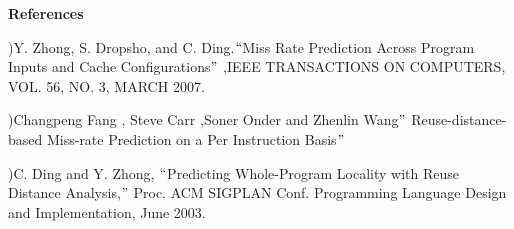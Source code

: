 \documentclass[12pt]{article}
\begin{document}
\vspace{\baselineskip}
{\fontsize{20pt}{24.0pt}\selectfont \textbf{References}\par}\par


\vspace{\baselineskip}

\vspace{\baselineskip}
\begin{adjustwidth}{0.0in}{0.15in}
{\fontsize{10pt}{12.0pt})Y. Zhong, S. Dropsho, and C. Ding.$``$Miss Rate Prediction Across Program Inputs and Cache Configurations$"$ ,IEEE TRANSACTIONS ON COMPUTERS, VOL. 56, NO. 3, MARCH 2007.\par}\par

\end{adjustwidth}


\vspace{\baselineskip}
\begin{adjustwidth}{0.0in}{0.43in}
{\fontsize{11pt}{13.2pt})Changpeng Fang , Steve Carr ,Soner Onder and Zhenlin Wang$"$  Reuse-distance-based Miss-rate Prediction on a Per Instruction Basis$"$ \par}\par

\end{adjustwidth}


\vspace{\baselineskip}
\begin{adjustwidth}{0.0in}{0.22in}
{\fontsize{11pt}{13.2pt})C. Ding and Y. Zhong, $``$Predicting Whole-Program Locality with Reuse Distance Analysis,$"$  Proc. ACM SIGPLAN Conf. Programming Language Design and Implementation, June 2003.\par}\par

\end{adjustwidth}


\printbibliography
\end{document}
